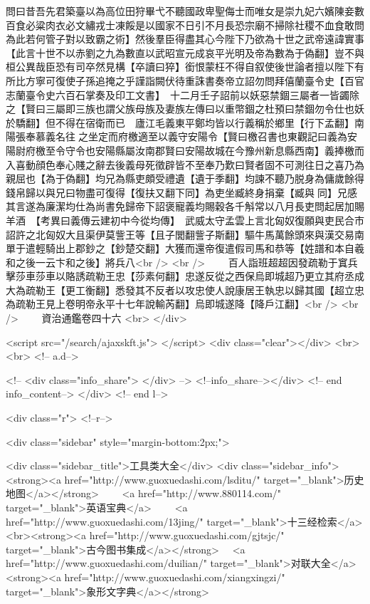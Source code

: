 問曰昔吾先君築臺以為高位田狩畢弋不聽國政卑聖侮士而唯女是崇九妃六嬪陳妾數百食必粱肉衣必文繡戎士凍餒是以國家不日引不月長恐宗廟不掃除社稷不血食敢問為此若何管子對以致霸之術】然後羣臣得盡其心今陛下乃欲為十世之武帝遠諱實事【此言十世不以赤劉之九為數直以武昭宣元成哀平光明及帝為數為于偽翻】豈不與桓公異哉臣恐有司卒然見構【卒讀曰猝】銜恨蒙枉不得自叙使後世論者擅以陛下有所比方寧可復使子孫追掩之乎謹詣闕伏待重誅書奏帝立詔勿問拜僖蘭臺令史【百官志蘭臺令史六百石掌奏及印工文書】　十二月壬子詔前以妖惡禁錮三屬者一皆蠲除之【賢曰三屬即三族也謂父族母族及妻族左傳曰以重幣錮之杜預曰禁錮勿令仕也妖於驕翻】但不得在宿衛而已　廬江毛義東平鄭均皆以行義稱於鄉里【行下孟翻】南陽張奉慕義名往之坐定而府檄適至以義守安陽令【賢曰檄召書也東觀記曰義為安陽尉府檄至令守令也安陽縣屬汝南郡賢曰安陽故城在今豫州新息縣西南】義捧檄而入喜動顔色奉心賤之辭去後義母死徵辟皆不至奉乃歎曰賢者固不可測往日之喜乃為親屈也【為于偽翻】均兄為縣吏頗受禮遺【遺于季翻】均諫不聽乃脱身為傭歲餘得錢帛歸以與兄曰物盡可復得【復扶又翻下同】為吏坐臧終身捐棄【臧與同】兄感其言遂為廉潔均仕為尚書免歸帝下詔褒寵義均賜穀各千斛常以八月長吏問起居加賜羊酒　【考異曰義傳云建初中今從均傳】　武威太守孟雲上言北匈奴復願與吏民合市詔許之北匈奴大且渠伊莫訾王等【且子閭翻訾子斯翻】驅牛馬萬餘頭來與漢交易南單于遣輕騎出上郡鈔之【鈔楚交翻】大獲而還帝復遣假司馬和恭等【姓譜和本自羲和之後一云卞和之後】將兵八<br />
<br />
　　百人詣班超超因發疏勒于窴兵擊莎車莎車以賂誘疏勒王忠【莎素何翻】忠遂反從之西保烏即城超乃更立其府丞成大為疏勒王【更工衡翻】悉發其不反者以攻忠使人說康居王執忠以歸其國【超立忠為疏勒王見上卷明帝永平十七年說輸芮翻】烏即城遂降【降戶江翻】<br />
<br />
　　資治通鑑卷四十六  <br>
   </div> 

<script src="/search/ajaxskft.js"> </script>
 <div class="clear"></div>
<br>
<br>
 <!-- a.d-->

 <!--
<div class="info_share">
</div> 
-->
 <!--info_share--></div>   <!-- end info_content-->
  </div> <!-- end l-->

<div class="r">   <!--r-->



<div class="sidebar"  style="margin-bottom:2px;">

 
<div class="sidebar_title">工具类大全</div>
<div class="sidebar_info">
<strong><a href="http://www.guoxuedashi.com/lsditu/" target="_blank">历史地图</a></strong>　　
<a href="http://www.880114.com/" target="_blank">英语宝典</a>　　
<a href="http://www.guoxuedashi.com/13jing/" target="_blank">十三经检索</a>　
<br><strong><a href="http://www.guoxuedashi.com/gjtsjc/" target="_blank">古今图书集成</a></strong>　
<a href="http://www.guoxuedashi.com/duilian/" target="_blank">对联大全</a>　<strong><a href="http://www.guoxuedashi.com/xiangxingzi/" target="_blank">象形文字典</a></strong>　

